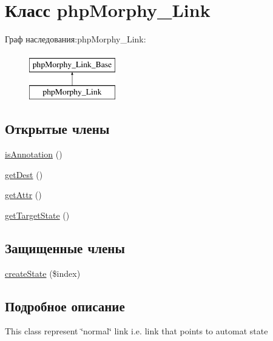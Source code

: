 \hypertarget{classphpMorphy__Link}{
\section{Класс phpMorphy\_\-Link}
\label{classphpMorphy__Link}
}
Граф наследования:phpMorphy\_\-Link:\begin{figure}[H]
\begin{center}
\leavevmode
\includegraphics[height=2.000000cm]{classphpMorphy__Link}
\end{center}
\end{figure}
\subsection*{Открытые члены}
\begin{DoxyCompactItemize}
\item 
\hyperlink{classphpMorphy__Link_a33302c5ee1e0525cafbb549c8855a622}{isAnnotation} ()
\item 
\hyperlink{classphpMorphy__Link_a6c55b93fab1237ec18cd864756e83a72}{getDest} ()
\item 
\hyperlink{classphpMorphy__Link_a0745fdc429582421d0c74dfe7ea39f79}{getAttr} ()
\item 
\hyperlink{classphpMorphy__Link_a167f1d5ce8218f7037cb32e50876e0ed}{getTargetState} ()
\end{DoxyCompactItemize}
\subsection*{Защищенные члены}
\begin{DoxyCompactItemize}
\item 
\hyperlink{classphpMorphy__Link_aa8583fb5afbe0c870a996a3abca64bb7}{createState} (\$index)
\end{DoxyCompactItemize}


\subsection{Подробное описание}
This class represent \char`\"{}normal\char`\"{} link i.e. link that points to automat state 

